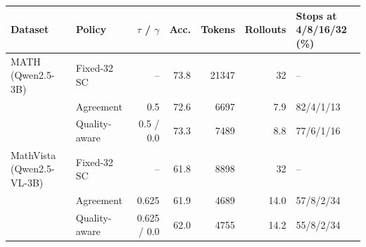 \begin{tabular}{llrrrrl}
\toprule
Dataset & Policy & $\tau$ / $\gamma$ & Acc. & Tokens & Rollouts & Stops at 4/8/16/32 (\%) \\
\midrule
MATH (Qwen2.5-3B) & Fixed-32 SC & -- & 73.8 & 21347 & 32 & -- \\
 & Agreement & 0.5 & 72.6 & 6697 & 7.9 & 82/4/1/13 \\
 & Quality-aware & 0.5 / 0.0 & 73.3 & 7489 & 8.8 & 77/6/1/16 \\
\midrule
MathVista (Qwen2.5-VL-3B) & Fixed-32 SC & -- & 61.8 & 8898 & 32 & -- \\
 & Agreement & 0.625 & 61.9 & 4689 & 14.0 & 57/8/2/34 \\
 & Quality-aware & 0.625 / 0.0 & 62.0 & 4755 & 14.2 & 55/8/2/34 \\
\bottomrule
\end{tabular}
